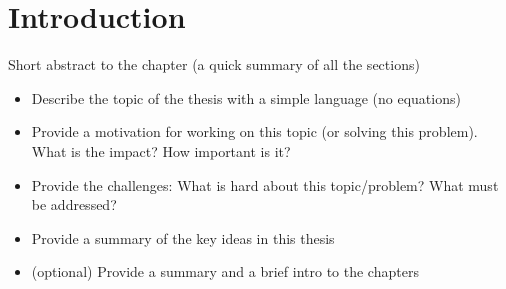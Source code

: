 \chapter{Introduction}
\label{ch:introduction}

Short abstract to the chapter (a quick summary of all the sections)

\begin{itemize}
\item Describe the topic of the thesis with a simple language (no equations)
\item Provide a motivation for working on this topic (or solving this problem). What is the impact? How important is it?
\item Provide the challenges: What is hard about this topic/problem? What must be addressed?
\item Provide a summary of the key ideas in this thesis
\item (optional) Provide a summary and a brief intro to the chapters
\end{itemize}